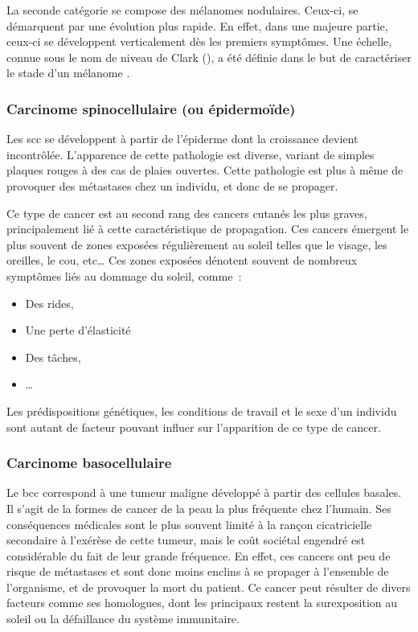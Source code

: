 \addtocounter{footnote}{1}
La seconde catégorie se compose des mélanomes nodulaires. Ceux-ci, se démarquent par une évolution plus rapide. En effet, dans une majeure partie, ceux-ci se développent verticalement dès les premiers symptômes. Une échelle, connue sous le nom de niveau de Clark (), a été définie dans le but de caractériser le stade d’un mélanome \cite{Clark1969}.\par

\subsubsection{Carcinome spinocellulaire (ou épidermoïde)}
Les \gls{scc} se développent à partir de l'épiderme dont la croissance devient incontrôlée. L’apparence de cette pathologie est diverse, variant de simples plaques rouges à des cas de plaies ouvertes. Cette pathologie est plus à même de provoquer des métastases chez un individu, et donc de se propager.\par

Ce type de cancer est au second rang des cancers cutanés les plus graves, principalement lié à cette caractéristique de propagation. Ces cancers émergent le plus souvent de zones exposées régulièrement au soleil telles que le visage, les oreilles, le cou, etc… Ces zones exposées dénotent souvent de nombreux symptômes liés au dommage du soleil, comme~:
\begin{itemize}
\item Des rides,
\item Une perte d’élasticité
\item Des tâches,
\item \ldots
\end{itemize}
Les prédispositions génétiques, les conditions de travail et le sexe d’un individu sont autant de facteur pouvant influer sur l’apparition de ce type de cancer.\par

\subsubsection{Carcinome basocellulaire}	
Le \gls{bcc} correspond à une tumeur maligne développé à partir des cellules basales. Il s’agit de la formes de cancer de la peau la plus fréquente chez l'humain. Ses conséquences médicales sont le plus souvent limité à la rançon cicatricielle secondaire à l'exérèse de cette tumeur, mais le coût sociétal engendré est considérable du fait de leur grande fréquence. En effet, ces cancers ont peu de risque de métastases et sont donc moins enclins à se propager à l’ensemble de l’organisme, et de provoquer la mort du patient. Ce cancer peut résulter de divers facteurs comme ses homologues, dont les principaux restent la surexposition au soleil ou la défaillance du système immunitaire.\par


